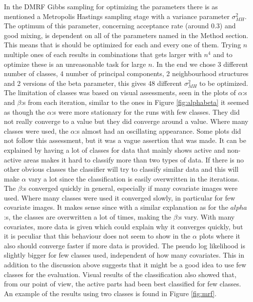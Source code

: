 \documentclass[a4paper,english]{article}
\begin{document}
In the DMRF Gibbs sampling for optimizing the parameters there is as mentioned a Metropolis Hastings sampling stage with a variance parameter  $\sigma_{MH}^2$.
The optimum of this parameter, concerning acceptance rate (around $0.3$) and good mixing, is dependent on all of the parameters named in the Method section.
This means that is should be optimized for each and every one of them.
Trying $n$ multiple ones of each results in combinations that gets larger with $n^4$ and to optimize these is an unreasonable task for large $n$.
In the end we chose 3 different number of classes, 4 number of principal components, 2 neighbourhood structures and 2 versions of the beta parameter, this gives 48 different $\sigma_{MH}^2$ to be optimized. The limitation of classes was based on visual assessments, seen in the plots of $\alpha$:s and $\beta$:s from each iteration, similar to the ones in Figure \ref{fig:alphabeta} it seemed as though the $\alpha$:s were more stationary for the runs with few classes. They did not really converge to a value but they did converge around a value. Where many classes were used, the $\alpha$:s almost had an oscillating appearance. Some plots did not follow this assessment, but it was a vague assertion that was made.
It can be explained by having a lot of classes for data that mainly shows active and non-active areas makes it hard to classify more than two types of data. If there is no other obvious classes the classifier will try to classify similar data and this will make $\alpha$ vary a lot since the classification is easily overwritten in the iterations. The $\beta$:s converged quickly in general, especially if many covariate images were used. Where many classes were used it converged slowly, in particular for few covariate images. It makes sense since with a similar explanation as for the $alpha$:s, the classes are overwritten a lot of times, making the $\beta$:s vary. With many covariates, more data is given which could explain why it converges quickly, but it is peculiar that this behaviour does not seem to show in the $\alpha$ plots where it also should converge faster if more data is provided. The pseudo log likelihood is slightly bigger for few classes used, independent of how many covariates. This in addition to the discussion above suggests that it might be a good idea to use few classes for the evaluation. Visual results of the classification also showed that, from our point of view, the active parts had been best classified for few classes. An example of the results using two classes is found in Figure \ref{fig:mrf}.
\end{document}
